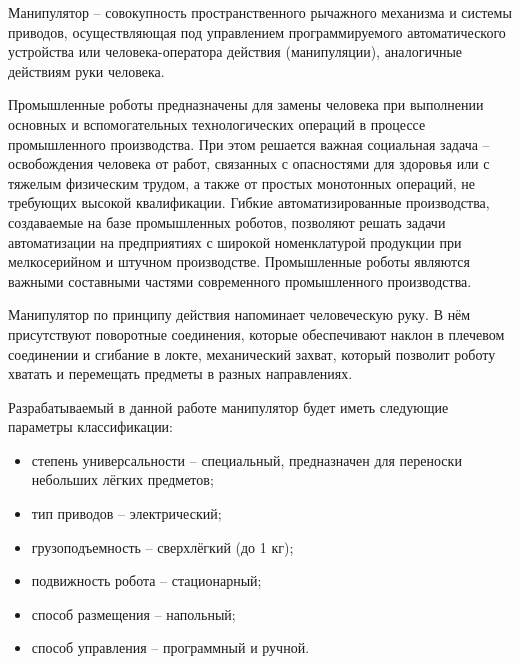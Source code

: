 Манипулятор – совокупность пространственного рычажного механизма и системы приводов, осуществляющая под управлением программируемого автоматического устройства или человека-оператора действия (манипуляции), аналогичные действиям руки человека.

Промышленные роботы предназначены для замены человека при выполнении основных и вспомогательных технологических операций в процессе промышленного производства. При этом решается важная социальная задача -- освобождения человека от работ, связанных с опасностями для здоровья или с тяжелым физическим трудом, а также от простых монотонных операций, не требующих высокой квалификации. Гибкие автоматизированные производства, создаваемые на базе промышленных роботов, позволяют решать задачи автоматизации на предприятиях с широкой номенклатурой продукции при мелкосерийном и штучном производстве. Промышленные роботы являются важными составными частями современного промышленного производства.

Манипулятор по принципу действия напоминает человеческую руку. В нём присутствуют поворотные соединения, которые обеспечивают наклон в плечевом соединении и сгибание в локте, механический захват, который позволит роботу хватать и перемещать предметы в разных направлениях.

Разрабатываемый в данной работе манипулятор будет иметь следующие параметры классификации:

\begin{itemize}
\item степень универсальности – специальный, предназначен для переноски небольших лёгких предметов;
\item тип приводов – электрический;
\item грузоподъемность – сверхлёгкий (до 1 кг);
\item подвижность робота – стационарный;
\item способ размещения – напольный;
\item способ управления – программный и ручной.
\end{itemize}